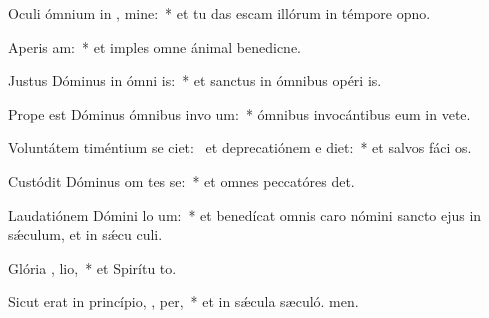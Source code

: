\item Oculi ómnium in  , mine:~* et tu das escam illórum in témpore opno.
\item Aperis   am:~* et imples omne ánimal benedicne.
\item Justus Dóminus in ómni  is:~* et sanctus in ómnibus opéri is.
\item Prope est Dóminus ómnibus invo um:~* ómnibus invocántibus eum in vete.
\item Voluntátem timéntium se ciet:~\pscross{} et deprecatiónem e diet:~* et salvos fáci os.
\item Custódit Dóminus om tes se:~* et omnes peccatóres det.
\item Laudatiónem Dómini lo  um:~* et benedícat omnis caro nómini sancto ejus in sǽculum, et in sǽcu culi.
\item Glória ,  lio,~* et Spirítu to.
\item Sicut erat in princípio,  ,  per,~* et in sǽcula sæculó. men.
